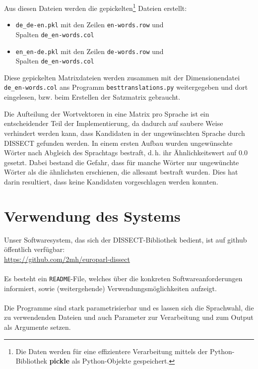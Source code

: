 \documentclass[11pt,twoside,openright]{mpreport}
\begin{document}
Aus diesen Dateien werden die gepickelten\footnote{Die Daten werden für eine effizientere Verarbeitung mittels der Python-Bibliothek \textbf{pickle} als Python-Objekte gespeichert.} Dateien erstellt:
\begin{itemize}
\item \verb+de_de-en.pkl+ mit den Zeilen \verb+en-words.row+ und \\Spalten \verb+de_en-words.col+
\item \verb+en_en-de.pkl+ mit den Zeilen \verb+de-words.row+ und \\Spalten \verb+de_en-words.col+
\end{itemize}

Diese gepickelten Matrixdateien werden zusammen mit der Dimensionendatei \verb+de_en-words.col+ ans Programm \verb+besttranslations.py+ weitergegeben und dort eingelesen, bzw. beim Erstellen der Satzmatrix gebraucht.

Die Aufteilung der Wortvektoren in eine Matrix pro Sprache ist ein entscheidender Teil der Implementierung, da dadurch auf saubere Weise verhindert werden kann, dass Kandidaten in der ungewünschten Sprache durch DISSECT gefunden werden. In einem ersten Aufbau wurden ungewünschte Wörter nach Abgleich des Sprachtags bestraft, d.\,h. ihr Ähnlichkeitswert auf 0.0 gesetzt. Dabei bestand die Gefahr, dass für manche Wörter nur ungewünchte Wörter als die ähnlichsten
erschienen, die allesamt bestraft wurden. Dies hat darin resultiert, dass
keine Kandidaten vorgeschlagen werden konnten.

\section{Verwendung des Systems}
\label{sec:verwendung}
Unser Softwaresystem, das sich der DISSECT-Bibliothek bedient, ist
auf github öffentlich verfügbar:\\
\url{https://github.com/2mh/europarl-dissect}
\\
\\
Es besteht ein \verb+README+-File, welches über die konkreten 
Softwareanforderungen informiert, sowie (weitergehende) 
Verwendungsmöglichkeiten aufzeigt.
\\
\\
Die Programme sind stark parametrisierbar und es lassen sich die Sprachwahl, die zu verwendenden Dateien und auch Parameter zur Verarbeitung und zum Output als Argumente setzen.
\end{document}
